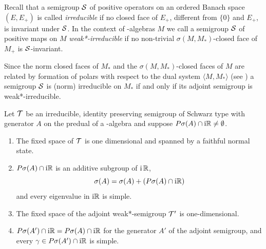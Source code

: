 Recall that a semigroup $\mathcal{S}$ of positive operators on an ordered Banach space $(E,E_{+})$ is called \emph{irreducible} if no closed face of\/ $E_{+}$, different from $\{0\}$ and $E_{+}$, is invariant under $\mathcal{S}$.
In the context of \WA-algebras $M$ we call a semigroup $\mathcal{S}$ of positive maps on $M$ \emph{weak*-irreducible} if no non-trivial $\sigma(M,M_{*})$-closed face of\/ $M_{+}$ is $\mathcal{S}$-invariant.

Since the norm closed faces of\/ $M_{*}$ and the $\sigma(M,M_{*})$-closed faces of\/ $M$ are related by formation of polars with respect to the dual system $\langle M,M_{*} \rangle$ (see \textcite[Theorem 3.6.11 and Theorem 3.10.7.]{pedersen:1979}) a semigroup $\mathcal{S}$ is (norm) irreducible on $M_{*}$ if and only if its adjoint semigroup is weak*-irreducible.
\begin{theorem}\label{thm:d3-1.11}
Let $\mathcal{T}$ be an irreducible, identity preserving semigroup of Schwarz type with generator $A$ on the predual of a \WA-algebra and suppose $P\sigma(A) \cap \mathrm{i}\mathbb{R} \neq \emptyset$.
\begin{enumerate}[\upshape (i)]
\item 
The fixed space of\/ $\mathcal{T}$ is one dimensional and spanned by a faithful normal state.

\item 
$P\sigma(A) \cap \mathrm{i}\mathbb{R}$ is an additive subgroup of\/ $\mathrm{i} \, \mathbb{R}$,
\[
\sigma(A) = \sigma(A) + (P\sigma(A) \cap \mathrm{i}\mathbb{R})
\]
and every eigenvalue in $\mathrm{i}\mathbb{R}$ is simple.

\item 
The fixed space of the adjoint weak*-semigroup $\mathcal{T}'$ is one-dimensional.

\item 
$P{\sigma}(A') \cap \mathrm{i}\mathbb{R} = P\sigma(A) \cap \mathrm{i}\mathbb{R}$ for the generator $A'$ of the adjoint semigroup, and every $\gamma \in P{\sigma}(A') \cap \mathrm{i}\mathbb{R}$ is simple.
\end{enumerate}
\end{theorem}
